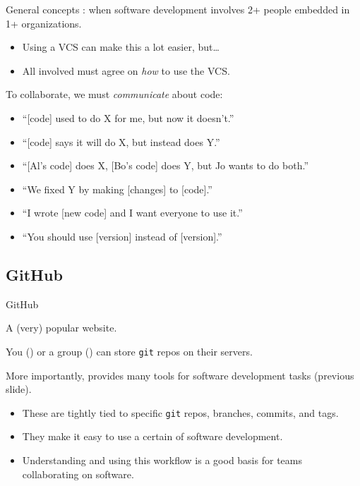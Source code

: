 \documentclass[12pt,aspectratio=169]{beamer}
\begin{document}
\begin{frame}{General concepts}
: when software development involves 2+ people embedded in 1+ organizations.

\begin{itemize}
  \item Using a VCS can make this a lot easier, but…
  \item All involved must agree on \emph{how} to use the VCS.
\end{itemize}

\bigskip
To collaborate, we must \emph{communicate} about code:
\begin{itemize}
  \item “[code] used to do X for me, but now it doesn't.”
  \item “[code] says it will do X, but instead does Y.”
  \item “[Al's code] does X, [Bo's code] does Y, but Jo wants to do both.”
  \item “We fixed Y by making [changes] to [code].”
  \item “I wrote [new code] and I want everyone to use it.”
  \item “You should use [version] instead of [version].”
\end{itemize}

\end{frame}

\subsection{GitHub}
\begin{frame}{GitHub}

A (very) popular website.

\bigskip
You () or a group () can store \texttt{git} repos on their servers.

\bigskip
More importantly, provides many tools for software development tasks (previous slide).
\begin{itemize}
  \item These are tightly tied to specific \texttt{git} repos, branches, commits, and tags.
  \item They make it easy to use a certain  of software development.
  \item Understanding and using this workflow is a good basis for teams collaborating on software.
\end{itemize}

\end{frame}
\end{document}
